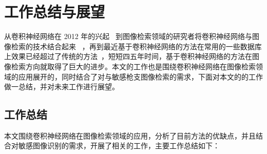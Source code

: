 
\chapter{工作总结与展望}\label{chapter:conclusion}

从卷积神经网络在 2012 年的兴起~\cite{Krizhevsky2012ImageNetCW} 到图像检索领域的研究者将卷积神经网络与图像检索的技术结合起来~\cite{Babenko2014NeuralCF,Gong2014MultiscaleOP} ，再到最近基于卷积神经网络的方法在常用的一些数据库上效果已经超过了传统的方法~\cite{Gordo2016DeepIR,Noh2017LargeScaleIR}，短短四五年时间，基于卷积神经网络的方法在图像检索方向就取得了巨大的进步。本文的工作也是围绕卷积神经网络在图像检索领域的应用展开的，同时结合了对与敏感枪支图像检索的需求，下面对本文的的工作做一总结，并对未来工作进行展望。

\section{工作总结}
本文围绕卷积神经网络在图像检索领域的应用，分析了目前方法的优缺点，并且结合对敏感图像识别的需求，开展了相关的工作，主要工作总结如下：

